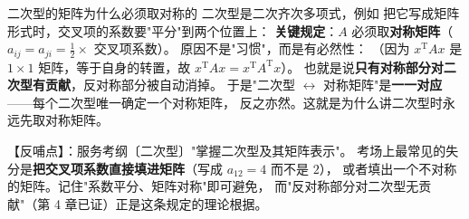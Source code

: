 
\begin{fdeep}{二次型的矩阵为什么必须取对称的}
二次型是二次齐次多项式，例如
把它写成矩阵形式时，交叉项的系数要"平分"到两个位置上：
\textbf{关键规定}：$A$ 必须取\textbf{对称矩阵}（$a_{ij}=a_{ji}=\frac12\times$ 交叉项系数）。
原因不是"习惯"，而是有必然性：
（因为 $x^{\mathrm T}Ax$ 是 $1\times1$ 矩阵，等于自身的转置，故 $x^{\mathrm T}Ax=x^{\mathrm T}A^{\mathrm T}x$）。
也就是说\textbf{只有对称部分对二次型有贡献}，反对称部分被自动消掉。
于是"二次型 $\leftrightarrow$ 对称矩阵"是\textbf{一一对应}——每个二次型唯一确定一个对称矩阵，
反之亦然。这就是为什么讲二次型时永远先取对称矩阵。

【反哺点】：服务考纲〔二次型〕"掌握二次型及其矩阵表示"。
考场上最常见的失分是\textbf{把交叉项系数直接填进矩阵}（写成 $a_{12}=4$ 而不是 $2$），
或者填出一个不对称的矩阵。记住"系数平分、矩阵对称"即可避免，
而"反对称部分对二次型无贡献"（第 4 章已证）正是这条规定的理论根据。
\end{fdeep}

